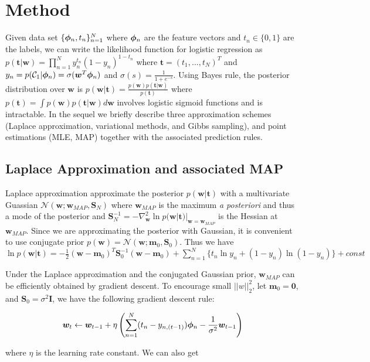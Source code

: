 \section{Method}
Given data set $\{\bm{\phi}_n, t_n\}_{n=1}^N$ where $\bm{\phi}_n$ are the feature
vectors and $t_n\in \{0,1\}$ are the labels, we can write the likelihood
function for logistic regression as $p(\bm{t}|\bm{w}) = \prod_{n=1}^N
y_n^{t_n} (1-y_n)^{1-t_n}$ where $\bm{t} = (t_1,...,t_N)^T$ and
$y_n=p(\mathcal{C}_1|\bm{\phi}_n) = \sigma(\bm{w}^T \bm{\phi}_n)$ and $\sigma(s) =
\frac{1}{1+e^{-s}}$. Using Bayes rule, the posterior distribution over
$\bm{w}$ is $p(\bm{w}|\bm{t}) = \frac{p(\bm{w}) p(\bm{t}|\bm{w})}{p(\bm{t})}$
where $p(\bm{t}) = \int p(\bm{w})p(\bm{t}|\bm{w}) d\bm{w}$ involves logistic
sigmoid functions and is intractable. In the sequel we briefly describe three
approximation schemes (Laplace approximation, variational methods, and Gibbs
sampling), and point estimations (MLE, MAP) together with the associated
prediction rules.

\subsection{Laplace Approximation and associated MAP}

Laplace approximation approximate the posterior $p(\bm{w}|\bm{t})$ with a
multivariate Guassian $\mathcal{N}(\bm{w}; \bm{w}_{MAP}, \bm{S}_N)$ where
$\bm{w}_{MAP}$ is the maximum {\it a posteriori} and thus a mode of the
posterior and $\bm{S}_N^{-1} = -\nabla^2_{\bm{w}} \ln
p(\bm{w}|\bm{t})|_{\bm{w} = \bm{w}_{MAP}}$ is the Hessian at $\bm{w}_{MAP}$.
Since we are approximating the posterior with Gaussian, it is convenient to
use conjugate prior $p(\bm{w}) = \mathcal{N}(\bm{w};\bm{m}_0,\bm{S}_0)$. Thus
we have $\ln p(\bm{w}|\bm{t}) = -\frac{1}{2}(\bm{w}-\bm{m}_0)^T
\bm{S}_0^{-1}(\bm{w}-\bm{m}_0) + \sum_{n=1}^N\{t_n \ln y_n +(1-y_n) \ln
(1-y_n)\} + const$

Under the Laplace approximation and the conjugated Gaussian prior, $\bm{w}_{MAP}$
can be efficiently obtained by gradient descent. To encourage small
$||w||^2_2$, let $\bm{m}_0 = \bm{0}$, and $\bm{S}_0 = \sigma^2 \bm{I}$, we
have the following gradient descent rule: 

\begin{equation}
\bm{w}_t \leftarrow \bm{w}_{t-1} + \eta\left( \sum_{n=1}^N (t_n - y_{n,(t-1)}) \bm{\phi}_n -
\frac{1}{\sigma^2}\bm{w}_{t-1} \right)
\end{equation}

where $\eta$ is the learning rate constant. We can also get

